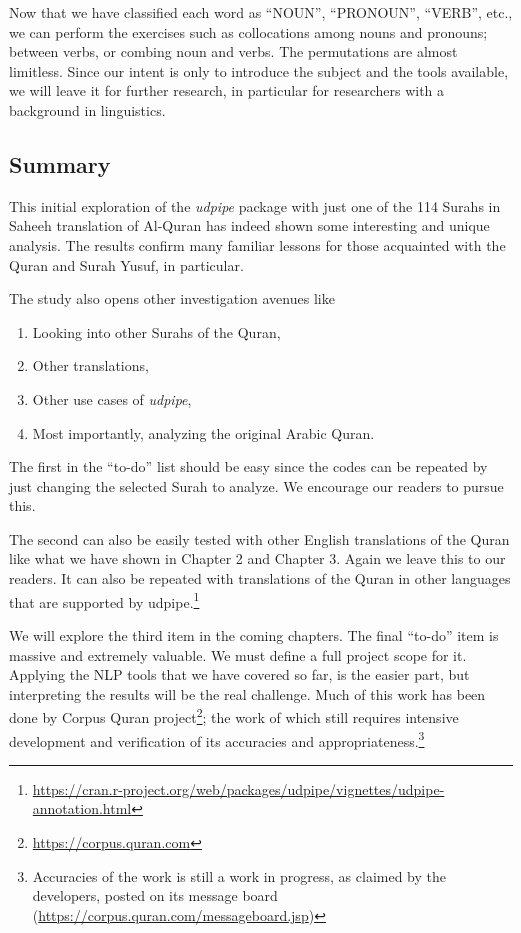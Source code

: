 \documentclass[
]{article}
\providecommand{\tightlist}{%
  \setlength{\itemsep}{0pt}\setlength{\parskip}{0pt}}
\begin{document}
Now that we have classified each word as ``NOUN'', ``PRONOUN'', ``VERB'', etc., we can perform the exercises such as collocations among nouns and pronouns; between verbs, or combing noun and verbs. The permutations are almost limitless. Since our intent is only to introduce the subject and the tools available, we will leave it for further research, in particular for researchers with a background in linguistics.

\hypertarget{chapter-4-summary}{%
\subsection{Summary}\label{chapter-4-summary}}

This initial exploration of the \emph{udpipe} package with just one of the 114 Surahs in Saheeh translation of Al-Quran has indeed shown some interesting and unique analysis. The results confirm many familiar lessons for those acquainted with the Quran and Surah Yusuf, in particular.

The study also opens other investigation avenues like

\begin{enumerate}
\def\labelenumi{\arabic{enumi}.}
\tightlist
\item
  Looking into other Surahs of the Quran,
\item
  Other translations,
\item
  Other use cases of \emph{udpipe},
\item
  Most importantly, analyzing the original Arabic Quran.
\end{enumerate}

The first in the ``to-do'' list should be easy since the codes can be repeated by just changing the selected Surah to analyze. We encourage our readers to pursue this.

The second can also be easily tested with other English translations of the Quran like what we have shown in Chapter 2 and Chapter 3. Again we leave this to our readers. It can also be repeated with translations of the Quran in other languages that are supported by udpipe.\footnote{\url{https://cran.r-project.org/web/packages/udpipe/vignettes/udpipe-annotation.html}}

We will explore the third item in the coming chapters. The final ``to-do'' item is massive and extremely valuable. We must define a full project scope for it. Applying the NLP tools that we have covered so far, is the easier part, but interpreting the results will be the real challenge. Much of this work has been done by Corpus Quran project\footnote{\url{https://corpus.quran.com}}; the work of which still requires intensive development and verification of its accuracies and appropriateness.\footnote{Accuracies of the work is still a work in progress, as claimed by the developers, posted on its message board (\url{https://corpus.quran.com/messageboard.jsp})}
\end{document}
